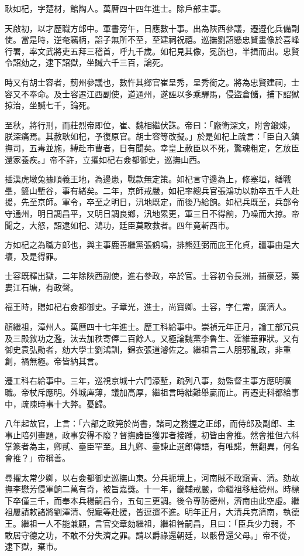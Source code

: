 \begin{pinyinscope}
耿如杞，字楚材，館陶人。萬曆四十四年進士。除戶部主事。

天啟初，以才歷職方郎中。軍書旁午，日應數十事。出為陜西參議，遷遵化兵備副使。當是時，逆奄竊柄，諂子無所不至，至建祠祝禧。巡撫劉詔懸忠賢畫像於喜峰行署，率文武將吏五拜三稽首，呼九千歲。如杞見其像，冕旒也，半揖而出。忠賢令詔劾之，逮下詔獄，坐贓六千三百，論死。

時又有胡士容者，薊州參議也，數忤其鄉官崔呈秀，呈秀銜之。將為忠賢建祠，士容又不奉命。及士容遷江西副使，道通州，遂誣以多乘驛馬，侵盜倉儲，捕下詔獄掠治，坐贓七千，論死。

至秋，將行刑，而莊烈帝即位，崔、魏相繼伏誅。帝曰：「廠衛深文，附會鍛煉，朕深痛焉。其赦耿如杞，予復原官。胡士容等改擬。」於是如杞上疏言：「臣自入鎮撫司，五毒並施，縛赴市曹者，日有聞矣。幸皇上赦臣以不死，驚魂粗定，乞放臣還家養疾。」帝不許，立擢如杞右僉都御史，巡撫山西。

插漢虎墩兔據順義王地，為邊患，戰款無定策。如杞言守邊為上，修塞垣，繕戰壘，鏟山塹谷，事有緒矣。二年，京師戒嚴，如杞率總兵官張鴻功以勍卒五千人赴援，先至京師。軍令，卒至之明日，汛地既定，而後乃給餉。如杞兵既至，兵部令守通州，明日調昌平，又明日調良鄉，汛地累更，軍三日不得餉，乃噪而大掠。帝聞之，大怒，詔逮如杞、鴻功，廷臣莫敢救者。四年竟斬西市。

方如杞之為職方郎也，與主事鹿善繼黨張鶴鳴，排熊廷弼而庇王化貞，疆事由是大壞，及是得罪。

士容既釋出獄，二年除陜西副使，進右參政，卒於官。士容初令長洲，捕豪惡，築婁江石塘，有政聲。

福王時，贈如杞右僉都御史。子章光，進士，尚寶卿。士容，字仁常，廣濟人。

顏繼祖，漳州人。萬曆四十七年進士。歷工科給事中。崇禎元年正月，論工部冗員及三殿敘功之濫，汰去加秩寄俸二百餘人。又極論魏黨李魯生、霍維華罪狀。又有御史袁弘勛者，劾大學士劉鴻訓，錦衣張道濬佐之。繼祖言二人朋邪亂政，非重創，禍無極。帝皆納其言。

遷工科右給事中。三年，巡視京城十六門濠塹，疏列八事，劾監督主事方應明曠職。帝杖斥應明。外城庳薄，議加高厚，繼祖言時絀難舉贏而止。再遷吏科都給事中，疏陳時事十大弊。憂歸。

八年起故官，上言：「六部之政筦於尚書，諸司之務握之正郎，而侍郎及副郎、主事止陪列畫題，政事安得不廢？督撫諸臣獲罪者接踵，初皆由會推。然會推但六科掌篆者為主，卿貳、臺臣罕至。且九卿、臺諫止選郎傳語，有唯諾，無翻異，何名會推？」帝稱善。

尋擢太常少卿，以右僉都御史巡撫山東。分兵扼境上，河南賊不敢窺青、濟。劾故撫李懋芳侵軍餉二萬有奇，被旨嘉獎。十一年，畿輔戒嚴，命繼祖移駐德州。時標下卒僅三千，而奉本兵楊嗣昌令，五旬三更調。後令專防德州，濟南由此空虛。繼祖屢請敕諸將劉澤清、倪寵等赴援，皆逗遛不進。明年正月，大清兵克濟南，執德王。繼祖一人不能兼顧，言官交章劾繼祖，繼祖咎嗣昌，且曰：「臣兵少力弱，不敢居守德之功，不敢不分失濟之罪。請以爵祿還朝廷，以骸骨還父母。」帝不從，逮下獄，棄市。


\end{pinyinscope}
